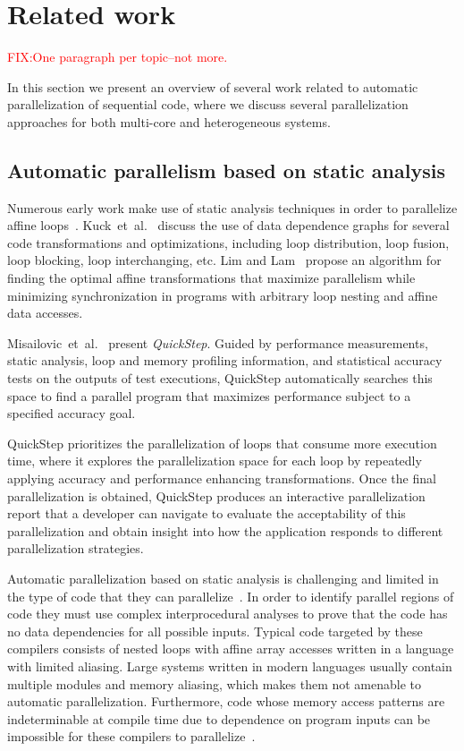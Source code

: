 \documentclass[a4paper,12pt]{article}
\newcommand{\etal}{et~al.}
\newcommand\FIXME[1]{\textcolor{red}{FIX:}\textcolor{red}{#1}}
\begin{document}
\section{Related work}
\FIXME{One paragraph per topic--not more.}


In this section we present an overview of several work related to automatic
parallelization of sequential code, where we discuss several parallelization
approaches for both multi-core and heterogeneous systems.

\subsection{Automatic parallelism based on static analysis}

Numerous early work make use of static analysis techniques in order to
parallelize affine loops~\cite{kuck81,padua93,blume94,lim97}.
Kuck~\etal~\cite{kuck81} discuss the use of data dependence graphs for several
code transformations and optimizations, including loop distribution, loop
fusion, loop blocking, loop interchanging, etc.  Lim and Lam~\cite{lim97}
propose an algorithm for finding the optimal affine transformations that
maximize parallelism while minimizing synchronization in programs with
arbitrary loop nesting and affine data accesses.

Misailovic~\etal~\cite{misailovic13} present {\em QuickStep}. Guided by
performance measurements, static analysis, loop and memory profiling
information, and statistical accuracy tests on the outputs of test executions,
QuickStep automatically searches this space to find a parallel program that
maximizes performance subject to a specified accuracy goal.

QuickStep prioritizes the parallelization of loops that consume more execution
time, where it explores the parallelization space for each loop by repeatedly
applying accuracy and performance enhancing transformations.  Once the final
parallelization is obtained, QuickStep produces an interactive parallelization
report that a developer can navigate to evaluate the acceptability of this
parallelization and obtain insight into how the application responds to
different parallelization strategies.

Automatic parallelization based on static analysis is challenging and limited
in the type of code that they can
parallelize~\cite{bruening98,kennedy01,chen03}.  In order to identify parallel
regions of code they must use complex interprocedural analyses to prove that
the code has no data dependencies for all possible inputs.  Typical code
targeted by these compilers consists of nested loops with affine array accesses
written in a language with limited aliasing.  Large systems written in modern
languages usually contain multiple modules and memory aliasing, which makes
them not amenable to automatic parallelization.  Furthermore, code whose memory
access patterns are indeterminable at compile time due to dependence on program
inputs can be impossible for these compilers to parallelize~\cite{bruening98}.
\end{document}
